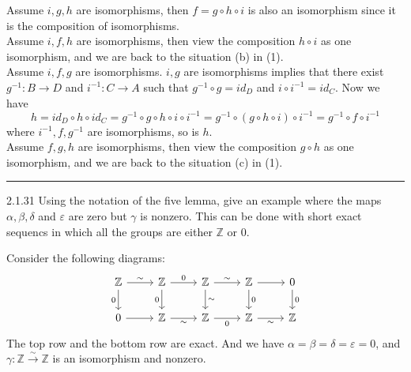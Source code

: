 \documentclass[a4paper, 12pt]{article}
\begin{document}
\begin{solution}
\begin{enumerate}[(1)]
Assume \(i,g,h\) are isomorphisms, then \(f=g\circ h\circ i\) is also an isomorphism since it is the composition of isomorphisms.\\ 
Assume \(i,f,h\) are isomorphisms, then view the composition \(h\circ i\) as one isomorphism, and we are back to the situation (b) in (1).\\ 
Assume \(i,f,g\) are isomorphisms. \(i,g\) are isomorphisms implies that there exist \(g^{-1}:B\rightarrow D\) and \(i^{-1}:C\rightarrow A\) such that \(g^{-1}\circ g=id_D\) and 
\(i\circ i^{-1}=id_C\). Now we have 
\[h=id_D\circ h\circ id_C=g^{-1}\circ g\circ h\circ i\circ i^{-1}=g^{-1}\circ (g\circ h\circ i)\circ i^{-1}=g^{-1}\circ f\circ i^{-1} \]
where \(i^{-1},f,g^{-1}\) are isomorphisms, so is \(h\).\\ 
Assume \(f,g,h\) are isomorphisms, then view the composition \(g\circ h\) as one isomorphism, and we are back to the situation (c) in (1).
\end{enumerate}
\end{solution}

\noindent\rule{7in}{2.8pt}
\begin{problem}{2.1.31}
Using the notation of the five lemma, give an example where the maps \(\alpha,\beta,\delta\) and \(\varepsilon\) are zero but \(\gamma\) is nonzero. 
This can be done with short exact sequencs in which all the groups are either \(\mathbb{Z}\) or \(0\).
\end{problem}
\begin{solution}
Consider the following diagrams:
\[\begin{tikzcd}
	{\mathbb{Z}} & {\mathbb{Z}} & {\mathbb{Z}} & {\mathbb{Z}} & 0 \\
	0 & {\mathbb{Z}} & {\mathbb{Z}} & {\mathbb{Z}} & {\mathbb{Z}}
	\arrow["\sim", from=1-1, to=1-2]
	\arrow["0"', from=1-1, to=2-1]
	\arrow["0", from=1-2, to=1-3]
	\arrow["0"', from=1-2, to=2-2]
	\arrow["\sim", from=1-3, to=1-4]
	\arrow["\sim", from=1-3, to=2-3]
	\arrow[from=1-4, to=1-5]
	\arrow["0", from=1-4, to=2-4]
	\arrow["0", from=1-5, to=2-5]
	\arrow[from=2-1, to=2-2]
	\arrow["\sim"', from=2-2, to=2-3]
	\arrow["0"', from=2-3, to=2-4]
	\arrow["\sim"', from=2-4, to=2-5]
\end{tikzcd}\]
The top row and the bottom row are exact. And we have \(\alpha=\beta=\delta=\varepsilon=0\), and \(\gamma:\mathbb{Z}\xrightarrow{\sim} \mathbb{Z}\) is an isomorphism and nonzero.
\end{solution}
\end{document}
